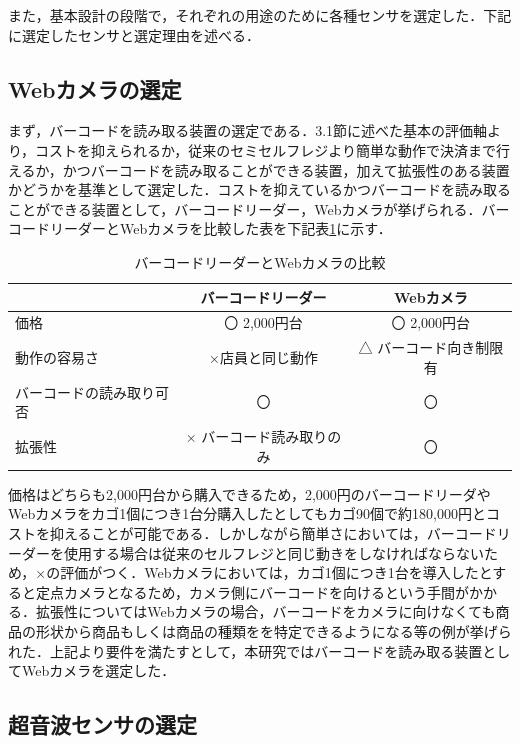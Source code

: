 また，基本設計の段階で，それぞれの用途のために各種センサを選定した．下記に選定したセンサと選定理由を述べる．


\subsection{Webカメラの選定}


まず，バーコードを読み取る装置の選定である．3.1節に述べた基本の評価軸より，コストを抑えられるか，従来のセミセルフレジより簡単な動作で決済まで行えるか，かつバーコードを読み取ることができる装置，加えて拡張性のある装置かどうかを基準として選定した．コストを抑えているかつバーコードを読み取ることができる装置として，バーコードリーダー，Webカメラが挙げられる．バーコードリーダーとWebカメラを比較した表を下記表\ref{came}に示す．


\begin{table}[htb]
\begin{center}
\caption{バーコードリーダーとWebカメラの比較}
\begin{tabular}{|l|c|c|} \hline
 & バーコードリーダー & Webカメラ \\ \hline \hline
価格 & 〇 2,000円台 & 〇 2,000円台 \\
動作の容易さ & ×店員と同じ動作 & △ バーコード向き制限有 \\
バーコードの読み取り可否 & 〇 & 〇 \\
拡張性 & × バーコード読み取りのみ & 〇 \\ \hline
\end{tabular}
\label{came}
\end{center}
\end{table}


価格はどちらも2,000円台から購入できるため，2,000円のバーコードリーダやWebカメラをカゴ1個につき1台分購入したとしてもカゴ90個で約180,000円とコストを抑えることが可能である．しかしながら簡単さにおいては，バーコードリーダーを使用する場合は従来のセルフレジと同じ動きをしなければならないため，×の評価がつく．Webカメラにおいては，カゴ1個につき1台を導入したとすると定点カメラとなるため，カメラ側にバーコードを向けるという手間がかかる．拡張性についてはWebカメラの場合，バーコードをカメラに向けなくても商品の形状から商品もしくは商品の種類をを特定できるようになる等の例が挙げられた．上記より要件を満たすとして，本研究ではバーコードを読み取る装置としてWebカメラを選定した．


\subsection{超音波センサの選定}


